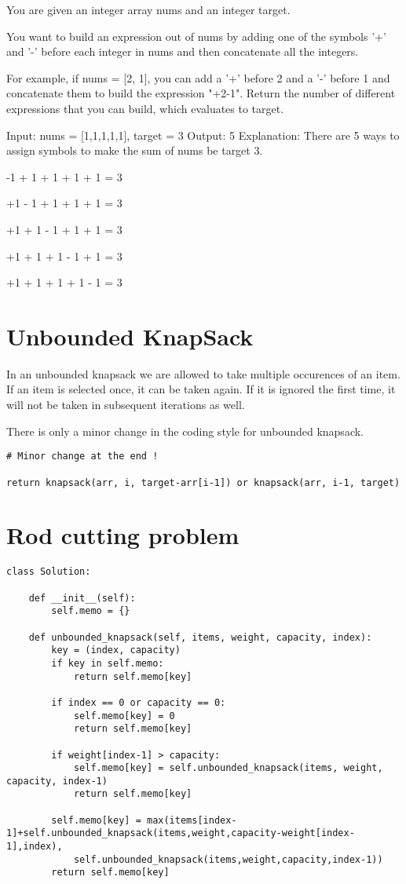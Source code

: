 \documentclass[24pt, a4]{article}
\begin{document}
You are given an integer array nums and an integer target.

You want to build an expression out of nums by adding one of the symbols '+' and '-' before each integer in nums and then concatenate all the integers.

For example, if nums = [2, 1], you can add a '+' before 2 and a '-' before 1 and concatenate them to build the expression "+2-1".
Return the number of different expressions that you can build, which evaluates to target.

Input: nums = [1,1,1,1,1], target = 3
Output: 5
Explanation: There are 5 ways to assign symbols to make the sum of nums be target 3.

-1 + 1 + 1 + 1 + 1 = 3

+1 - 1 + 1 + 1 + 1 = 3

+1 + 1 - 1 + 1 + 1 = 3

+1 + 1 + 1 - 1 + 1 = 3

+1 + 1 + 1 + 1 - 1 = 3

\newpage
\section{Unbounded KnapSack}

In an unbounded knapsack we are allowed to take multiple occurences of an item. If an item is selected once, it can be taken again. If it is ignored the first time, it will not be taken in subsequent iterations as well.

There is only a minor change in the coding style for unbounded knapsack.

\begin{lstlisting}
# Minor change at the end !

return knapsack(arr, i, target-arr[i-1]) or knapsack(arr, i-1, target)
\end{lstlisting}

\section{Rod cutting problem}
\begin{lstlisting}
class Solution:

    def __init__(self):
        self.memo = {}

    def unbounded_knapsack(self, items, weight, capacity, index):
        key = (index, capacity)
        if key in self.memo:
            return self.memo[key]

        if index == 0 or capacity == 0:
            self.memo[key] = 0
            return self.memo[key]

        if weight[index-1] > capacity:
            self.memo[key] = self.unbounded_knapsack(items, weight, capacity, index-1)
            return self.memo[key]

        self.memo[key] = max(items[index-1]+self.unbounded_knapsack(items,weight,capacity-weight[index-1],index),
            self.unbounded_knapsack(items,weight,capacity,index-1))
        return self.memo[key]
\end{lstlisting}
\end{document}
